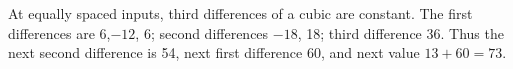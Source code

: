 At equally spaced inputs, third differences of a cubic are constant. The first differences are 6,$-12$, 6; second differences $-18$, 18; third difference 36. Thus the next second difference is 54, next first difference 60, and next value $13+60=\boxed{73}$.

